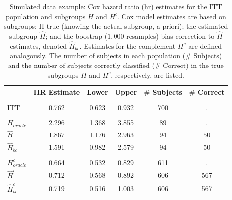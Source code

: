 \documentclass[smallextended]{svjour3}
\begin{document}
\begin{table}

\caption{\label{tab:simex_tab}\label{tab:simex} Simulated data example: Cox hazard ratio (hr) estimates for the ITT population and subgroups $H$ and $H^{c}$.
Cox model estimates are based on subgroups: H true (knowing the actual subgroup, a-priori); the estimated subgroup $\hat{H}$; and 
the boostrap ($1,000$ resamples) bias-correction to $\hat{H}$ estimates, denoted $\hat{H}_{bc}$.  Estimates for the complement $H^{c}$ are defined analogously.
The number of subjects in each population ($\#$ Subjects) and the number of subjects correctly classified ($\#$ Correct) in the true subgroups $H$ and $H^{c}$, respectively, are listed.}
\centering
\fontsize{9}{11}\selectfont
\begin{tabular}[t]{lccccc}
\toprule
  & HR Estimate & Lower & Upper & $\#$ Subjects & $\#$ Correct\\
\midrule
\addlinespace[0.3em]
\multicolumn{6}{l}{\textbf{ITT}}\\
\hspace{1em}ITT & 0.762 & 0.623 & 0.932 & 700 & .\\
\addlinespace[0.3em]
\multicolumn{6}{l}{\textbf{H subgroup estimates}}\\
\hspace{1em}$H_{oracle}$ & 2.296 & 1.368 & 3.855 & 89 & .\\
\hspace{1em}$\hat{H}$ & 1.867 & 1.176 & 2.963 & 94 & 50\\
\hspace{1em}$\hat{H}_{bc}$ & 1.591 & 0.982 & 2.579 & 94 & 50\\
\addlinespace[0.3em]
\multicolumn{6}{l}{\textbf{H-complement subgroup estimates}}\\
\hspace{1em}$H^{c}_{oracle}$ & 0.664 & 0.532 & 0.829 & 611 & .\\
\hspace{1em}$\hat{H}^{c}$ & 0.712 & 0.568 & 0.892 & 606 & 567\\
\hspace{1em}$\hat{H}^{c}_{bc}$ & 0.719 & 0.516 & 1.003 & 606 & 567\\
\bottomrule
\end{tabular}
\end{table}





\end{document}
